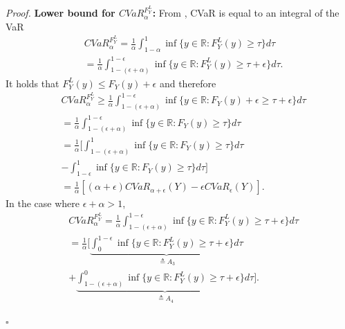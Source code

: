 \documentclass[letterpaper]{article} %
\newenvironment{proof}{\noindent\textit{Proof.}}{\hfill$\square$}
\begin{document}
\begin{proof}
	\textbf{Lower bound for $CVaR_\alpha^{F_Y^L}$:} From \cite{acerbi2002coherence}, CVaR is equal to an integral of the VaR
	\begin{equation}
		\begin{aligned}
			&CVaR_\alpha^{F_Y^L}=\frac{1}{\alpha}\int_{1-\alpha}^1 \inf \{y\in \mathbb{R}:F_Y^L(y)\geq \tau\} d\tau \\
			&=\frac{1}{\alpha}\int_{1-(\epsilon+\alpha)}^{1-\epsilon} \inf \{y\in \mathbb{R}:F_Y^L(y)\geq \tau +\epsilon\} d\tau.
		\end{aligned}
	\end{equation}
	It holds that $F_Y^L(y)\leq F_Y(y)+\epsilon$ and therefore
	\begin{equation}
		\begin{aligned}
			&CVaR_\alpha^{F_Y^L} \geq \frac{1}{\alpha}\int_{1-(\epsilon+\alpha)}^{1-\epsilon} \inf \{y\in \mathbb{R}:F_Y(y)+\epsilon \geq \tau +\epsilon\} d\tau \\
			&=\frac{1}{\alpha}\int_{1-(\epsilon+\alpha)}^{1-\epsilon} \inf \{y\in \mathbb{R}:F_Y(y)\geq \tau\} d\tau \\
			&=\frac{1}{\alpha}[\int_{1-(\epsilon+\alpha)}^{1} \inf \{y\in \mathbb{R}:F_Y(y)\geq \tau\} d\tau \\
			&-\int_{1-\epsilon}^{1} \inf \{y\in \mathbb{R}:F_Y(y)\geq \tau\} d\tau] \\
			&=\frac{1}{\alpha}[(\alpha+\epsilon)CVaR_{\alpha+\epsilon}(Y)-\epsilon CVaR_{\epsilon}(Y)].
		\end{aligned}
	\end{equation}
	In the case where $\epsilon+\alpha > 1$,
	\begin{equation}
		\begin{aligned}
			&CVaR_\alpha^{F_Y^L}=\frac{1}{\alpha}\int_{1-(\epsilon+\alpha)}^{1-\epsilon} \inf \{y\in \mathbb{R}:F_Y^L(y)\geq \tau +\epsilon\} d\tau \\
			&=\frac{1}{\alpha}[\underbrace{\int_{0}^{1-\epsilon} \inf \{y\in \mathbb{R}:F_Y^L(y)\geq \tau +\epsilon\} d\tau}_{\triangleq A_3} \\
			&+\underbrace{\int_{1-(\epsilon+\alpha)}^{0} \inf \{y\in \mathbb{R}:F_Y^L(y)\geq \tau +\epsilon\} d\tau}_{\triangleq A_4}].
		\end{aligned}
	\end{equation}
	

\end{proof}
\end{document}
